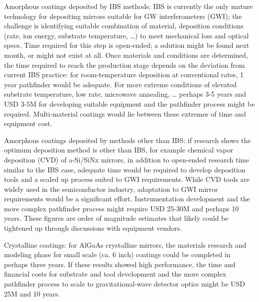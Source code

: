 Amorphous coatings deposited by IBS methods: IBS is currently the only mature technology for depositing mirrors suitable for GW interferometers (GWI); the challenge is identifying suitable combination of material, deposition conditions (rate, ion energy, substrate temperature, …)  to meet mechanical loss and optical specs. Time required for this step is open-ended; a solution might be found next month, or might not exist at all. Once materials and conditions are determined, the time required to reach the production stage depends on the deviation from current IBS practice: for room-temperature deposition at conventional rates,
1 year pathfinder would be adequate. For more extreme conditions of elevated substrate temperature, low rate, 
microwave annealing, … perhaps 3-5 years and USD 3-5M for developing suitable equipment and the pathfinder process might be required. Multi-material coatings would lie between these extremes of time and equipment cost. 

Amorphous coatings deposited by methods other than IBS: if research shows the optimum  deposition method is other than IBS, for example chemical vapor deposition (CVD) of a-Si/SiNx mirrors, in addition to open-ended research time similar to the IBS case, adequate time would be required to develop deposition tools and a scaled up process suited to GWI requirements. While CVD tools are widely used in the semiconductor industry, adaptation to GWI mirror requirements would be a significant effort. Instrumentation development and the more complex pathfinder process might require  USD 25-30M and perhaps 10 years. These figures are order of magnitude estimates that likely could be tightened up through discussions with equipment vendors. 

Crystalline coatings: for AlGaAs crystalline mirrors, the materials research and modeling phase for small scale (ca. 6 inch) coatings could be completed in perhaps three years. If these results showed high performance, the time and financial costs for substrate and tool development and the more complex pathfinder process to scale to gravitational-wave detector optics might be USD 25M and 10 years. 


 


